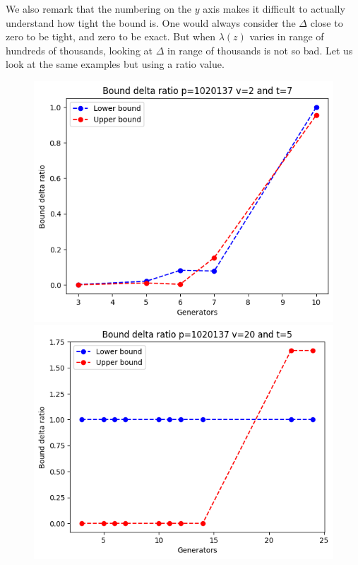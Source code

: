 \documentclass{article}
\begin{document}
We also remark that the numbering on the $y$ axis makes it difficult to actually understand how tight the bound is. One would always consider the $\Delta$ close to zero to be tight, and zero to be exact. But when $\lambda(z)$ varies in range of hundreds of thousands, looking at $\Delta$ in range of thousands is not so bad. Let us look at the same examples but using a ratio value.

\begin{figure}[H]
    \begin{minipage}{.49\textwidth}
            \centering
             \includegraphics[width=\textwidth]{../plots/tuples_figures/explosion_example_1.2.png}
             \includegraphics[width=\textwidth]{../plots/tuples_figures/explosion_example_3.2.png}

\end{minipage}
\end{figure}
\end{document}
